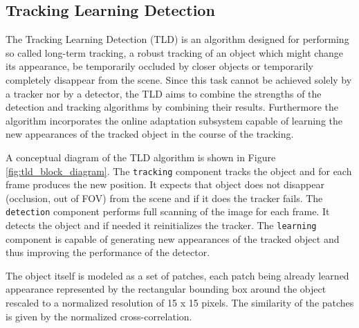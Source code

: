 \subsection{Tracking Learning Detection} \label{txt:tracking_learning_detection}

The Tracking Learning Detection (TLD) \cite{Kalal:2012:TRA:2225045.2225082} is an algorithm designed for performing so called long-term tracking, a robust tracking of an object which might change its appearance, be temporarily occluded by closer objects or temporarily completely disappear from the scene. Since this task cannot be achieved solely by a tracker nor by a detector, the TLD aims to combine the strengths of the detection and tracking algorithms by combining their results. Furthermore the algorithm incorporates the online adaptation subsystem capable of learning the new appearances of the tracked object in the course of the tracking.

A conceptual diagram of the TLD algorithm is shown in Figure \ref{fig:tld_block_diagram}. The \texttt{tracking} component tracks the object and for each frame produces the new position. It expects that object does not disappear (occlusion, out of FOV) from the scene and if it does the tracker fails. The \texttt{detection} component performs full scanning of the image for each frame. It detects the object and if needed it reinitializes the tracker. The \texttt{learning} component is capable of generating new appearances of the tracked object and thus improving the performance of the detector. 

The object itself is modeled as a set of patches, each patch being already learned appearance represented by the rectangular bounding box around the object rescaled to a normalized resolution of 15 x 15 pixels. The similarity of the patches is given by the normalized cross-correlation.

